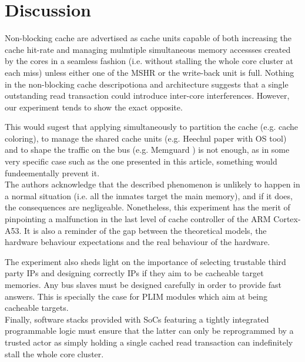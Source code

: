 \section{Discussion}
    Non-blocking cache are advertised as cache units capable of both increasing the cache hit-rate and managing mulmtiple simultaneous memory accessses created by the cores in a seamless fashion (i.e. without stalling the whole core cluster at each miss) unless either one of the MSHR or the write-back unit  is full. Nothing in the non-blocking cache descripotiona and architecture suggests that a single outstanding read transaction could introduce inter-core interferences. However, our experiment tends to show the exact opposite.

    This would sugest that applying simultaneously to partition the cache (e.g. cache coloring), to manage the shared cache units (e.g. Heechul paper with OS tool\cite{}) and to shape the traffic on the bus (e.g. Memguard \cite{}) is not enough, as in some very specific case such as the one presented in this article, something would fundeementally prevent it.\\

    The authors acknowledge that the described phenomenon is unlikely to happen in a normal situation (i.e. all the inmates target the main memory), and if it does, the consequences are negligeable. Nonetheless, this experiment has the merit of pinpointing a malfunction in the last level of cache controller of the ARM Cortex-A53. It is also a reminder of the gap between the theoretical models, the hardware behaviour expectations and the real behaviour of the hardware.

     The experiment also sheds light on the importance of selecting trustable third party IPs and designing correctly IPs if they aim to be cacheable target memories. Any bus slaves must be designed carefully in order to provide fast answers. This is specially the case for PLIM modules which aim at being cacheable targets.\\

     Finally, software stacks provided with SoCs featuring a tightly integrated programmable logic must ensure that the latter can only be reprogrammed by a trusted actor as simply holding a single cached read transaction can indefinitely stall the whole core cluster.

